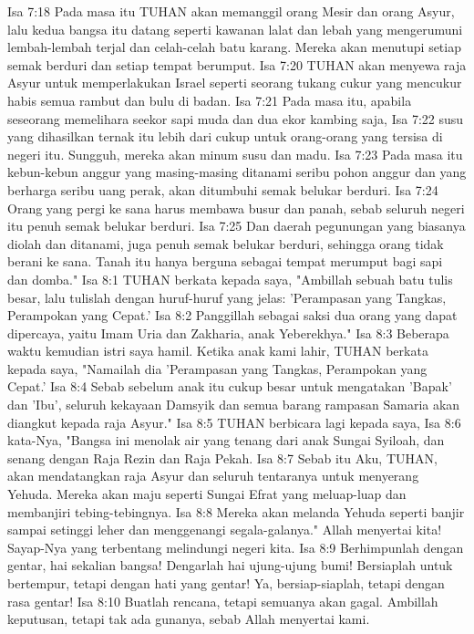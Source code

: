Isa 7:18  Pada masa itu TUHAN akan memanggil orang Mesir dan orang Asyur, lalu kedua bangsa itu datang seperti kawanan lalat dan lebah yang mengerumuni lembah-lembah terjal dan celah-celah batu karang. Mereka akan menutupi setiap semak berduri dan setiap tempat berumput.
Isa 7:20  TUHAN akan menyewa raja Asyur untuk memperlakukan Israel seperti seorang tukang cukur yang mencukur habis semua rambut dan bulu di badan.
Isa 7:21  Pada masa itu, apabila seseorang memelihara seekor sapi muda dan dua ekor kambing saja,
Isa 7:22  susu yang dihasilkan ternak itu lebih dari cukup untuk orang-orang yang tersisa di negeri itu. Sungguh, mereka akan minum susu dan madu.
Isa 7:23  Pada masa itu kebun-kebun anggur yang masing-masing ditanami seribu pohon anggur dan yang berharga seribu uang perak, akan ditumbuhi semak belukar berduri.
Isa 7:24  Orang yang pergi ke sana harus membawa busur dan panah, sebab seluruh negeri itu penuh semak belukar berduri.
Isa 7:25  Dan daerah pegunungan yang biasanya diolah dan ditanami, juga penuh semak belukar berduri, sehingga orang tidak berani ke sana. Tanah itu hanya berguna sebagai tempat merumput bagi sapi dan domba."
Isa 8:1  TUHAN berkata kepada saya, "Ambillah sebuah batu tulis besar, lalu tulislah dengan huruf-huruf yang jelas: 'Perampasan yang Tangkas, Perampokan yang Cepat.'
Isa 8:2  Panggillah sebagai saksi dua orang yang dapat dipercaya, yaitu Imam Uria dan Zakharia, anak Yeberekhya."
Isa 8:3  Beberapa waktu kemudian istri saya hamil. Ketika anak kami lahir, TUHAN berkata kepada saya, "Namailah dia 'Perampasan yang Tangkas, Perampokan yang Cepat.'
Isa 8:4  Sebab sebelum anak itu cukup besar untuk mengatakan 'Bapak' dan 'Ibu', seluruh kekayaan Damsyik dan semua barang rampasan Samaria akan diangkut kepada raja Asyur."
Isa 8:5  TUHAN berbicara lagi kepada saya,
Isa 8:6  kata-Nya, "Bangsa ini menolak air yang tenang dari anak Sungai Syiloah, dan senang dengan Raja Rezin dan Raja Pekah.
Isa 8:7  Sebab itu Aku, TUHAN, akan mendatangkan raja Asyur dan seluruh tentaranya untuk menyerang Yehuda. Mereka akan maju seperti Sungai Efrat yang meluap-luap dan membanjiri tebing-tebingnya.
Isa 8:8  Mereka akan melanda Yehuda seperti banjir sampai setinggi leher dan menggenangi segala-galanya." Allah menyertai kita! Sayap-Nya yang terbentang melindungi negeri kita.
Isa 8:9  Berhimpunlah dengan gentar, hai sekalian bangsa! Dengarlah hai ujung-ujung bumi! Bersiaplah untuk bertempur, tetapi dengan hati yang gentar! Ya, bersiap-siaplah, tetapi dengan rasa gentar!
Isa 8:10  Buatlah rencana, tetapi semuanya akan gagal. Ambillah keputusan, tetapi tak ada gunanya, sebab Allah menyertai kami.
